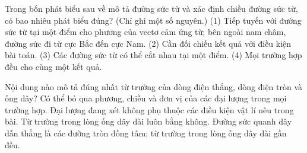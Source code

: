 \begin{ex}
Trong bốn phát biểu sau về mô tả đường sức từ và xác định chiều đường sức từ, có bao nhiêu phát biểu đúng? (Chỉ ghi một số nguyên.) (1) Tiếp tuyến với đường sức từ tại một điểm cho phương của vectơ cảm ứng từ; bên ngoài nam châm, đường sức đi từ cực Bắc đến cực Nam. (2) Cần đối chiếu kết quả với điều kiện bài toán. (3) Các đường sức từ có thể cắt nhau tại một điểm. (4) Mọi trường hợp đều cho cùng một kết quả.
\end{ex}

\begin{ex}
Nội dung nào mô tả đúng nhất từ trường của dòng điện thẳng, dòng điện tròn và ống dây?
\choice
{Có thể bỏ qua phương, chiều và đơn vị của các đại lượng trong mọi trường hợp.}
{Đại lượng đang xét không phụ thuộc các điều kiện vật lí nêu trong bài.}
{Từ trường trong lòng ống dây dài luôn bằng không.}
{\True Đường sức quanh dây dẫn thẳng là các đường tròn đồng tâm; từ trường trong lòng ống dây dài gần đều.}
\end{ex}


